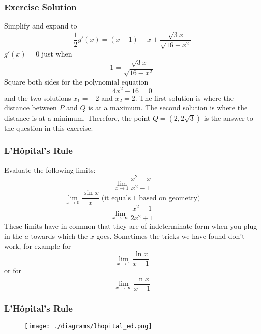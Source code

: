 \documentclass[xcolor=dvipsnames]{beamer}
\newcounter{exercise}
\begin{document}
\begin{frame}
  \frametitle{Exercise Solution}
Simplify and expand to
\begin{equation}
  \label{eq:deiquoot}
  \frac{1}{2}g'(x)=(x-1)-x+\frac{\sqrt{3}x}{\sqrt{16-x^{2}}}
\end{equation}
$g'(x)=0$ just when
\begin{equation}
  \label{eq:xoonahju}
  1=\frac{\sqrt{3}x}{\sqrt{16-x^{2}}}
\end{equation}
Square both sides for the polynomial equation
\begin{equation}
  \label{eq:uabaevoo}
4x^{2}-16=0
\end{equation}
and the two solutions $x_{1}=-2$ and $x_{2}=2$. The first solution is
where the distance between $P$ and $Q$ is at a maximum. The second
solution is where the distance is at a minimum. Therefore, the point
$Q=(2,2\sqrt{3})$ is the answer to the question in this exercise.
\end{frame}

\begin{frame}
  \frametitle{L'H{\^o}pital's Rule}
Evaluate the following limits:
\begin{equation}
  \label{eq:ohjishah}
  \lim_{x\rightarrow{}1}\frac{x^{2}-x}{x^{2}-1}
\end{equation}
\begin{equation}
  \label{eq:eighahth}
  \lim_{x\rightarrow{}0}\frac{\sin{}x}{x}\mbox{ (it equals 1 based on geometry)}
\end{equation}
\begin{equation}
  \label{eq:aiwohmae}
  \lim_{x\rightarrow\infty}\frac{x^{2}-1}{2x^{2}+1}
\end{equation}
These limits have in common that they are of \alert{indeterminate
  form} when you plug in the $a$ towards which the $x$ goes. Sometimes
the tricks we have found don't work, for example for
\begin{equation}
  \label{eq:jechuith}
  \lim_{x\rightarrow{}1}\frac{\ln{}x}{x-1}
\end{equation}
or for
\begin{equation}
  \label{eq:ieghaegh}
  \lim_{x\rightarrow{}\infty}\frac{\ln{}x}{x-1}
\end{equation}
\end{frame}

\begin{frame}
  \frametitle{L'H{\^o}pital's Rule}
\begin{figure}[h]
\texttt{[image: ./diagrams/lhopital\_ed.png]}
\end{figure}
\end{frame}
\end{document}
